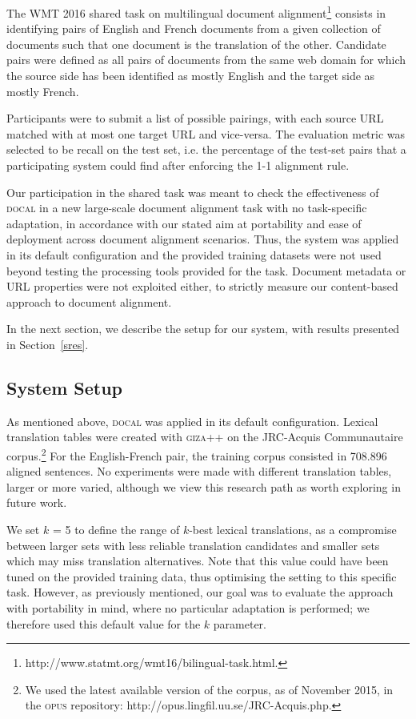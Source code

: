 \documentclass[11pt]{article}
\begin{document}
The WMT 2016 shared task on multilingual document alignment\footnote{http://www.statmt.org/wmt16/bilingual-task.html.} consists in identifying pairs of English and French documents from a given collection of documents such that one document is the translation of the other. Candidate pairs were defined as all pairs of documents from the same web domain for which the source side has been identified as mostly English and the target side as mostly French.   

Participants were to submit a list of possible pairings, with each source URL matched with at most one target URL and vice-versa. The evaluation metric was selected to be recall on the test set, i.e. the percentage of the test-set pairs that a participating system could find after enforcing the 1-1 alignment rule.

Our participation in the shared task was meant to check the effectiveness of \textsc{docal} in a new large-scale document alignment task with no task-specific adaptation, in accordance with our stated aim at portability and ease of deployment across document alignment scenarios. Thus, the system was applied in its default configuration and the provided training datasets were not used beyond testing the processing tools provided for the task. Document metadata or URL properties were not exploited either, to strictly measure our content-based approach to document alignment. 

In the next section, we describe the setup for our system, with results presented in Section~\ref{sres}. 

\subsection{System Setup}

As mentioned above, \textsc{docal} was applied in its default configuration. Lexical translation tables were created with \textsc{giza++} on the JRC-Acquis Communautaire corpus.\footnote{We used the latest available version of the corpus, as of November 2015, in the \textsc{opus} repository: http://opus.lingfil.uu.se/JRC-Acquis.php.} For the English-French pair, the training corpus consisted in 708.896 aligned sentences. No experiments were made with different translation tables, larger or more varied, although we view this research path as worth exploring in future work.

We set $k$ = 5 to define the range of $k$-best lexical translations, as a compromise between larger sets with less reliable translation candidates and smaller sets which may miss translation alternatives. Note that this value could have been tuned on the provided training data, thus optimising the setting to this specific task. However, as previously mentioned, our goal was to evaluate the approach with portability in mind, where no particular adaptation is performed; we therefore used this default value for the $k$ parameter.
\end{document}
